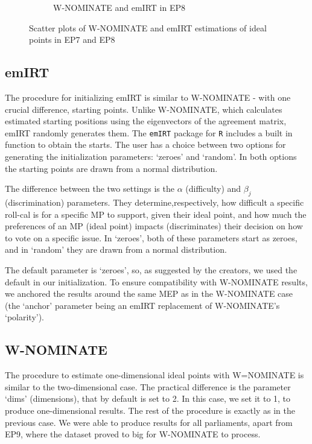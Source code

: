 \documentclass[a4paper,12pt]{report}
\begin{document}
\begin{figure}[H]
\begin{subfigure}[b]{0.48\textwidth}
            \caption{W-NOMINATE and emIRT in EP8}
            \label{fig:WNOMINATE_SCATTER_8}
        \end{subfigure}
        \caption{Scatter plots of W-NOMINATE and emIRT estimations of ideal points in EP7 and EP8}
        \label{fig:WNOMINATE_SCATTER_7_8}
    \end{figure}

    \subsection{emIRT}
    The procedure for initializing emIRT is similar to W-NOMINATE - with one crucial difference, starting points.
    Unlike W-NOMINATE, which calculates estimated starting positions using the eigenvectors of the agreement matrix,
    emIRT randomly generates them. The \texttt{emIRT} package for \texttt{R} includes a built in function to obtain
    the starts.
    The user has a choice between two options for generating the initialization parameters: `zeroes' and
    `random'.
    In both options the starting points are drawn from a normal distribution.

    The difference between the two settings is the \(\alpha\) (difficulty) and \(\beta_j\)
    (discrimination) parameters.
    They determine,respectively, how difficult a specific roll-cal is for a specific MP to support, given their ideal
    point, and how
    much the preferences of an MP (ideal point) impacts (discriminates) their decision on how to vote on a specific
    issue.
    In `zeroes', both of these parameters start as zeroes, and in `random' they are drawn from a normal
    distribution.

    The default parameter is `zeroes', so, as suggested by the creators, we used the default in our initialization.
    To ensure compatibility with W-NOMINATE results, we anchored the results around the same MEP as in the
    W-NOMINATE case (the `anchor' parameter being an emIRT replacement of W-NOMINATE's `polarity').

    \subsection{W-NOMINATE}
    The procedure to estimate one-dimensional ideal points with W=NOMINATE is similar to the two-dimensional case.
    The practical difference is the parameter `dims' (dimensions), that by default is set to 2.
    In this case, we set it to 1, to produce one-dimensional results.
    The rest of the procedure is exactly as in the previous case.
    We were able to produce results for all parliaments, apart from EP9, where the dataset proved to big for W-NOMINATE
    to process.
\end{document}
